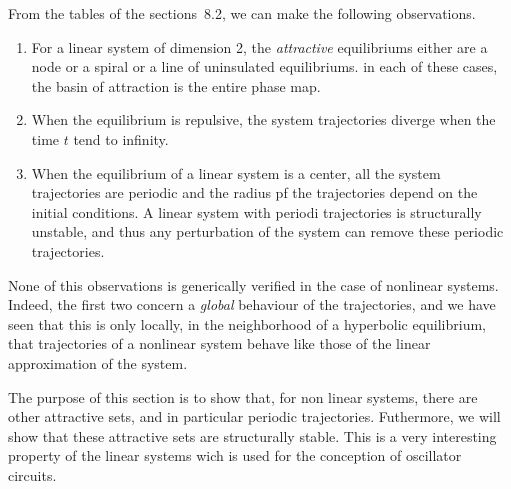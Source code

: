 From the tables of the sections~8.2, we can make the following observations.
\begin{enumerate}
\item For a linear system of dimension 2, the {\em attractive} equilibriums either are a node or a spiral or a line of uninsulated equilibriums. in
each of these cases, the basin of attraction is the entire phase map.
\item When the equilibrium is repulsive, the system trajectories diverge when the time $t$ tend to infinity.
\item When the equilibrium of a linear system is a center, all the system trajectories are periodic and the radius pf the trajectories depend on the initial conditions.
A linear system with periodi trajectories is structurally unstable, and thus any perturbation of the system can remove these periodic trajectories.
\end{enumerate}
None of this observations is generically verified in the case of nonlinear systems. Indeed, the first two concern a {\em global} behaviour of the trajectories, and we have seen that this is only locally, in the neighborhood of a hyperbolic equilibrium, that
trajectories of a nonlinear system behave like those of the linear approximation of the system.

The purpose of this section is to show that, for non linear systems, there are other attractive sets, and in particular periodic trajectories.
Futhermore, we will show that these attractive sets are structurally stable. This is a very interesting property of the linear systems wich is used for the conception of oscillator circuits.

